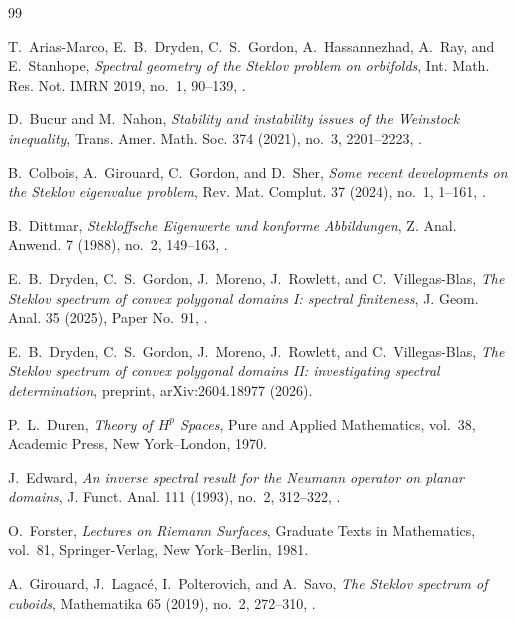 \documentclass[11pt,letterpaper,reqno]{amsart}
\theoremstyle{definition}
\begin{document}
\begin{thebibliography}{99}

T.~Arias-Marco, E.~B.~Dryden, C.~S.~Gordon, A.~Hassannezhad, A.~Ray,
and E.~Stanhope,
\emph{Spectral geometry of the Steklov problem on orbifolds},
Int. Math. Res. Not. IMRN 2019, no.~1, 90--139,
.

D.~Bucur and M.~Nahon,
\emph{Stability and instability issues of the Weinstock inequality},
Trans. Amer. Math. Soc. 374 (2021), no.~3, 2201--2223,
.

B.~Colbois, A.~Girouard, C.~Gordon, and D.~Sher,
\emph{Some recent developments on the Steklov eigenvalue problem},
Rev. Mat. Complut. 37 (2024), no.~1, 1--161,
.

B.~Dittmar,
\emph{Stekloffsche Eigenwerte und konforme Abbildungen},
Z. Anal. Anwend. 7 (1988), no.~2, 149--163,
.

E.~B.~Dryden, C.~S.~Gordon, J.~Moreno, J.~Rowlett, and
C.~Villegas-Blas,
\emph{The Steklov spectrum of convex polygonal domains I:
spectral finiteness},
J. Geom. Anal. 35 (2025), Paper No.~91,
.

E.~B.~Dryden, C.~S.~Gordon, J.~Moreno, J.~Rowlett, and
C.~Villegas-Blas,
\emph{The Steklov spectrum of convex polygonal domains II:
investigating spectral determination},
preprint, arXiv:2604.18977 (2026).

P.~L.~Duren,
\emph{Theory of $H^p$ Spaces},
Pure and Applied Mathematics, vol.~38, Academic Press,
New York--London, 1970.

J.~Edward,
\emph{An inverse spectral result for the Neumann operator on planar
domains},
J. Funct. Anal. 111 (1993), no.~2, 312--322,
.

O.~Forster,
\emph{Lectures on Riemann Surfaces},
Graduate Texts in Mathematics, vol.~81, Springer-Verlag,
New York--Berlin, 1981.

A.~Girouard, J.~Lagac\'e, I.~Polterovich, and A.~Savo,
\emph{The Steklov spectrum of cuboids},
Mathematika 65 (2019), no.~2, 272--310,
.


\end{thebibliography}
\end{document}
